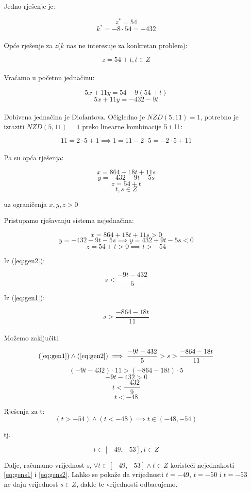 \documentclass[12pt]{article}
\begin{document}
Jedno rješenje je:

$$z^{*} = 54$$
$$k^{*} = - 8 \cdot 54 = - 432$$\\

Opće rješenje za $z$($k$ nas ne interesuje za konkretan problem):

$$z = 54 + t, t\in Z$$\\

Vraćamo u početnu jednačinu:

$$5x + 11y = 54 - 9(54 + t)$$
$$5x + 11y = -432 - 9t$$\\

Dobivena jednačina je Diofantova. Očigledno je $NZD(5, 11) = 1$, potrebno je izraziti $NZD(5, 11) = 1$ preko linearne kombinacije 5 i 11:

$$11 = 2 \cdot 5 + 1 \implies 1 = 11 - 2 \cdot 5 = - 2 \cdot 5 + 11$$\\

Pa su opća rješenja:

$$x = 864 + 18t + 11s$$
$$y = -432 - 9t - 5s$$
$$z = 54 + t$$
$$t, s\in Z$$
\begin{center}
uz ograničenja $x, y, z > 0$
\end{center}

Pristupamo rješavanju sistema nejednačina:

\[
x = 864 + 18t + 11s > 0 \label{eq:gen1} \tag{1}
\]
\[
y = -432 - 9t - 5s \implies y = 432 + 9t - 5s < 0 \label{eq:gen2} \tag{2}
\]
$$z = 54 + t > 0 \implies t > - 54$$

Iz (\ref{eq:gen2}):

\[
s < \frac{- 9t - 432}{5} \label{eq:gens1} \tag{A}
\]

Iz (\ref{eq:gen1}):

\[
s > \frac{- 864 - 18t}{11} \label{eq:gens2} \tag{B}
\]\\

Možemo zaključiti:

$$(\ref{eq:gen1}) \land (\ref{eq:gen2}) \implies \frac{- 9t - 432}{5} > s > \frac{- 864 - 18t}{11}$$
$$(- 9t - 432) \cdot 11 > (- 864 - 18t) \cdot 5$$
$$- 9t - 432 > 0$$
$$t < \frac{- 432}{9}$$
$$t < -48$$\vspace{1mm}

Rješenja za t: 
$$(t > -54) \land (t < -48) \implies t\in (-48, -54)$$

tj. 

$$t\in [-49, -53], t\in Z$$\vspace{1mm}

Dalje, računamo vrijednost s, $\forall t\in [-49, -53] \land t\in Z$ koristeći nejednakosti \ref{eq:gens1} i \ref{eq:gens2}. Lahko se pokaže da vrijednosti $t = - 49$, $t = - 50$ i $t = - 53$ ne daju vrijednost $s \in Z$, dakle te vrijednosti odbacujemo.\vspace{1mm}
\end{document}
